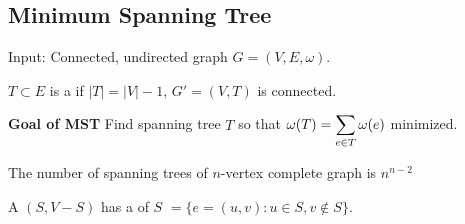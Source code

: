 \subsection{Minimum Spanning Tree}
\begin{example}
    Input: Connected, undirected graph $ G=(V,E,\omega) $.
    
    \begin{definition}
        $ T\subset E $ is a   if  $ |T|=|V|-1 $,  $ G'=(V,T) $ is connected.
        
        \textbf{Goal of MST } Find spanning tree  $ T $ so that  $ \displaystyle\omega(T)=\sum_{e\in T}\omega(e) $ minimized.  
    \end{definition}
    \begin{theorem}
        The number of spanning trees of  $ n $-vertex complete graph is  $ n^{n-2} $  
    \end{theorem}
    A   $ (S,V-S) $ has a  of  $ S $ $ =\{e=(u,v):u\in S,v\not\in S\} $.  
\end{example}